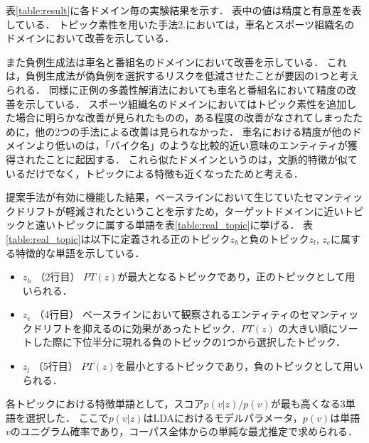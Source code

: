 \documentclass[japanese]{jnlp_1.4}
\begin{document}
表\ref{table:result}に各ドメイン毎の実験結果を示す．
表中の値は精度と有意差を表している．
トピック素性を用いた手法2.においては，車名とスポーツ組織名のドメインにおいて改善を示している．

\begin{table}[b] 
\label{table:result}

\end{table}

また負例生成法は車名と番組名のドメインにおいて改善を示している．
これは，負例生成法が偽負例を選択するリスクを低減させたことが要因の1つと考えられる．
同様に正例の多義性解消法においても車名と番組名において精度の改善を示している．
スポーツ組織名のドメインにおいてはトピック素性を追加した場合に明らかな改善が見られたものの，ある程度の改善がなされてしまったために，他の2つの手法による改善は見られなかった．
車名における精度が他のドメインより低いのは，「バイク名」のような比較的近い意味のエンティティが獲得されたことに起因する．
これら似たドメインというのは，文脈的特徴が似ているだけでなく，トピックによる特徴も近くなったためと考える．

\begin{table}[b] 
\label{table:real_topic}

\end{table}

提案手法が有効に機能した結果，ベースラインにおいて生じていたセマンティックドリフトが軽減されたということを示すため，ターゲットドメインに近いトピックと遠いトピックに属する単語を表\ref{table:real_topic}に挙げる．
表\ref{table:real_topic}は以下に定義される正のトピック$z_h$と負のトピック$z_l$, $z_e$に属する特徴的な単語を示している．
\begin{itemize}
\item{$z_h$ （2行目） $PT(z)$が最大となるトピックであり，正のトピックとして用いられる．}
\item{$z_e$ （4行目） ベースラインにおいて観察されるエンティティのセマンティックドリフトを抑えるのに効果があったトピック．$PT(z)$ の大きい順にソートした際に下位半分に現れる負のトピックの1つから選択したトピック．
}
\item{$z_l$ （5行目） $PT(z)$を最小とするトピックであり，負のトピックとして用いられる．}
\end{itemize}
各トピックにおける特徴単語として，スコア$p(v|z)/p(v)$が最も高くなる3単語を選択した．
ここで$p(v|z)$はLDAにおけるモデルパラメータ，$p(v)$は単語$v$のユニグラム確率であり，コーパス全体からの単純な最尤推定で求められる．
\end{document}
